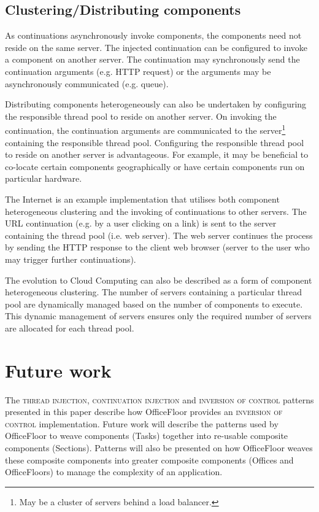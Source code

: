 \documentclass[prodmode]{style/acmlarge}
\begin{document}
\subsection{Clustering/Distributing components}

As continuations asynchronously invoke components, the components need not
reside on the same server.  The injected continuation can be configured to
invoke a component on another server.  The continuation may synchronously send
the continuation arguments (e.g. HTTP request) or the arguments may be
asynchronously communicated (e.g. queue).

Distributing components heterogeneously can also be undertaken by configuring
the responsible thread pool to reside on another server.  On invoking the
continuation, the continuation arguments are communicated to the
server\footnote{May be a cluster of servers behind a load balancer.} containing
the responsible thread pool.  Configuring the responsible thread pool to reside
on another server is advantageous.  For example, it may be beneficial to
co-locate certain components geographically or have certain components run on
particular hardware.

The Internet is an example implementation that utilises both component
heterogeneous clustering and the invoking of continuations to other servers. 
The URL continuation (e.g. by a user clicking on a link) is sent to the server
containing the thread pool (i.e. web server).  The web server continues the
process by sending the HTTP response to the client web browser (server to the
user who may trigger further continuations).

The evolution to Cloud Computing can also be described as a form of component
heterogeneous clustering.  The number of servers containing a particular thread
pool are dynamically managed based on the number of components to execute.  This
dynamic management of servers ensures only the required number of servers are
allocated for each thread pool.



\section{Future work}

The \textsc{thread injection}, \textsc{continuation injection} and
\textsc{inversion of control} patterns presented in this paper describe how
OfficeFloor \cite{officefloor} provides an \textsc{inversion of control}
implementation.  Future work will describe the patterns used by OfficeFloor to
weave components (Tasks) together into re-usable composite components
(Sections).  Patterns will also be presented on how OfficeFloor weaves these
composite components into greater composite components (Offices and
OfficeFloors) to manage the complexity of an application.
\end{document}
